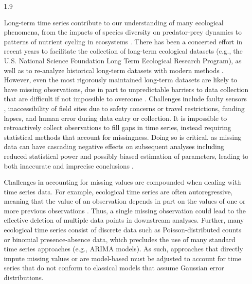 \documentclass[12pt,english]{article} %
\begin{document}
\begin{linenumbers}
\begin{spacing}{1.9}
\begin{flushleft}
\hspace{1em} Long-term time series contribute to our understanding of many ecological phenomena, from the impacts of species diversity on predator-prey dynamics to patterns of nutrient cycling in ecosystems \citep{Hughes2017, Likens1970, Sinclair2003}. There has been a concerted effort in recent years to facilitate the collection of long-term ecological datasets (e.g., the U.S. National Science Foundation Long Term Ecological Research Program), as well as to re-analyze historical long-term datasets with modern methods \citep{Adler2009, Buma2017}. However, even the most rigorously maintained long-term datasets are likely to have missing observations, due in part to unpredictable barriers to data collection that are difficult if not impossible to overcome \citep{lopucki2022handling, nakagawa_missing_2008}. Challenges include faulty sensors \citep{hossie_confronting_2021}, inaccessibility of field sites due to safety concerns or travel restrictions, funding lapses, and human error during data entry or collection. It is impossible to retroactively collect observations to fill gaps in time series, instead requiring statistical methods that account for missingness. Doing so is critical, as missing data can have cascading negative effects on subsequent analyses including reduced statistical power \citep{kang2013prevention, moritz_imputets_2017} and possibly biased estimation of parameters, leading to both inaccurate and imprecise conclusions \citep{aleryani2018dealing, kim_transcending_2018, junger_imputation_2015}.

\hspace{1em} 
Challenges in accounting for missing values are compounded when dealing with time series data. For example, ecological time series are often autoregressive, meaning that the value of an observation depends in part on the values of one or more previous observations \citep{carroll2000detecting}. %
Thus, a single missing observation could lead to the effective deletion of multiple data points in downstream analyses. Further, many ecological time series consist of discrete data such as Poisson-distributed counts or binomial presence-absence data, which precludes the use of many standard time series approaches (e.g., ARIMA models). As such, approaches that directly impute missing values or are model-based must be adjusted to account for time series that do not conform to classical models that assume Gaussian error distributions.


\end{flushleft}
\end{spacing}
\end{linenumbers}
\end{document}
